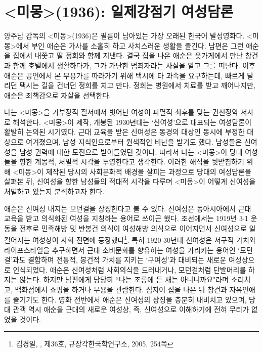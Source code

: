 \maketitle

\section*{<미몽>(1936): 일제강점기 여성담론}

양주남 감독의 <미몽>(1936)은 필름이 남아있는 가장 오래된 한국어 발성영화다. <미몽>에서 부인 애순은 가사를 소홀히 하고 사치스러운 생활을 즐긴다. 남편은 그런 애순을 집에서 내쫓고 딸 정희와 함께 지낸다. 결국 집을 나온 애순은 옷가게에서 만난 창건과 함께 호텔에서 생활하다가, 그가 가난한 범죄자라는 사실을 알고 그를 떠난다. 이후 애순은 공연에서 본 무용가를 따라가기 위해 택시에 타 과속을 요구하는데, 빠르게 달리던 택시는 길을 건너던 정희를 치고 만다. 정희는 병원에서 치료를 받고 깨어나지만, 애순은 죄책감으로 자살을 선택한다.

나는 <미몽>을 가부장적 질서에서 벗어난 여성이 파멸적 최후를 맞는 권선징악 서사로 해석한다. <미몽>이 제작, 개봉된 1930년대는 `신여성'으로 대표되는 여성담론이 활발히 논의된 시기였다. 근대 교육을 받은 신여성은 동경의 대상인 동시에 부정한 대상으로 여겨졌으며, 남성 지식인으로부터 원색적인 비난을 받기도 했다. 남성들은 신여성을 남성 권력에 대한 도전으로 받아들였던 것이다. 따라서 나는 <미몽>이 당대 여성들을 향한 계몽적, 처벌적 시각을 투영한다고 생각한다. 이러한 해석을 뒷받침하기 위해 <미몽>이 제작된 당시의 사회문화적 배경을 살피는 과정으로 당대의 여성담론을 살펴본 뒤, 신여성을 향한 남성들의 적대적 시각을 다루며 <미몽>이 어떻게 신여성을 처벌하고 있는지 분석하고자 한다.

애순은 신여성 내지는 모던걸을 상징한다고 볼 수 있다. 신여성은 동아시아에서 근대 교육을 받고 의식화된 여성을 지칭하는 용어로 쓰이곤 했다. 조선에서는 1919년 3$\cdot$1 운동을 전후로 민족해방 및 반봉건 의식이 여성해방 의식으로 이어지면서 신여성으로 일컬어지는 여성상이 사회 전면에 등장했다\footnote{김경일, ,  제36호, 규장각한국학연구소, 2005, 254쪽}. 특히 1920-30년대 신여성은 서구적 가치와 라이프스타일을 추구하면서 근대 소비문화를 향유하는 여성을 가리키는 용어인 `모던걸'과도 결합하며 전통적, 봉건적 가치를 지키는 `구여성'과 대비되는 새로운 여성상으로 인식되었다. 애순은 신여성처럼 사회의식을 드러내거나, 모던걸처럼 단발머리를 하지는 않는다. 하지만 남편에게 당당히 ``나는 조롱에 든 새는 아니니까요"라며 소리치고, 백화점에서 쇼핑을 하거나 무용을 관람한다. 심지어 집을 나온 뒤 창건과 자유연애를 즐기기도 한다. 영화 전반에서 애순은 신여성의 상징을 충분히 내비치고 있으며, 당대 관객 역시 애순을 근대의 새로운 여성상, 즉, 신여성으로 이해하기에 전혀 무리가 없었을 것이다.

